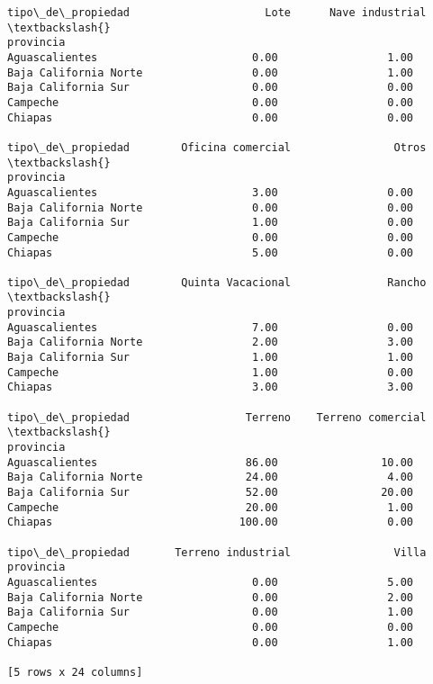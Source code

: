 \documentclass[11pt]{article}
\begin{document}
\begin{tcolorbox}[breakable, boxrule=.5pt, size=fbox, pad at break*=1mm, opacityfill=0]
\begin{Verbatim}[commandchars=\\\{\}]
tipo\_de\_propiedad                     Lote      Nave industrial  \textbackslash{}
provincia
Aguascalientes                        0.00                 1.00
Baja California Norte                 0.00                 1.00
Baja California Sur                   0.00                 0.00
Campeche                              0.00                 0.00
Chiapas                               0.00                 0.00

tipo\_de\_propiedad        Oficina comercial                Otros  \textbackslash{}
provincia
Aguascalientes                        3.00                 0.00
Baja California Norte                 0.00                 0.00
Baja California Sur                   1.00                 0.00
Campeche                              0.00                 0.00
Chiapas                               5.00                 0.00

tipo\_de\_propiedad        Quinta Vacacional               Rancho  \textbackslash{}
provincia
Aguascalientes                        7.00                 0.00
Baja California Norte                 2.00                 3.00
Baja California Sur                   1.00                 1.00
Campeche                              1.00                 0.00
Chiapas                               3.00                 3.00

tipo\_de\_propiedad                  Terreno    Terreno comercial  \textbackslash{}
provincia
Aguascalientes                       86.00                10.00
Baja California Norte                24.00                 4.00
Baja California Sur                  52.00                20.00
Campeche                             20.00                 1.00
Chiapas                             100.00                 0.00

tipo\_de\_propiedad       Terreno industrial                Villa
provincia
Aguascalientes                        0.00                 5.00
Baja California Norte                 0.00                 2.00
Baja California Sur                   0.00                 1.00
Campeche                              0.00                 0.00
Chiapas                               0.00                 1.00

[5 rows x 24 columns]
\end{Verbatim}
\end{tcolorbox}
        
\end{document}
